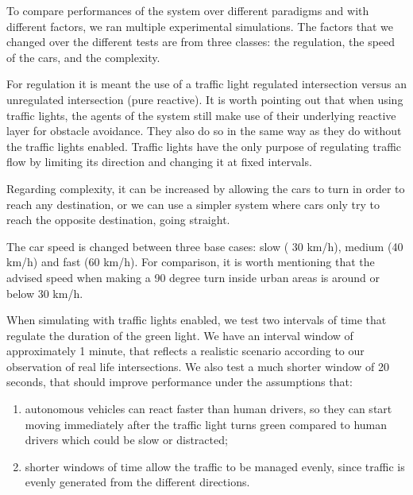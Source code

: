

To compare performances of the system over different paradigms and with different factors, we ran
multiple experimental simulations.
The factors that we changed over the different tests are from three classes: the regulation, the speed of the cars, and the complexity.

For regulation it is meant the use of  a traffic light regulated intersection versus an unregulated intersection (pure reactive).
It is worth pointing out that when using traffic lights, the agents of the system still make use of their underlying reactive layer for obstacle avoidance.
They also do so in the same way as they do without the traffic lights enabled.
Traffic lights have the only purpose of regulating traffic flow by limiting its direction and changing it at fixed intervals.

Regarding complexity, it can be increased by allowing the cars to turn in order to reach any destination, or we can use a simpler system where cars only try to reach the opposite destination, going straight.

The car speed is changed between three base cases: slow ( 30 km/h), medium (40 km/h) and fast (60 km/h).
For comparison, it is worth mentioning that the advised speed when making a 90 degree turn inside urban areas is around or below 30 km/h. %

When simulating with traffic lights enabled, we test two intervals of time that regulate the duration of the green light.
We have an interval window of approximately 1 minute, that reflects a realistic scenario according to our observation of real life intersections.
We also test a much shorter window of 20 seconds, that should improve performance under the assumptions that:
\begin{enumerate}
\item autonomous vehicles can react faster than human drivers, so they can start moving immediately after the traffic light turns green compared to human drivers which could be slow or distracted;
\item shorter windows of time allow the traffic to be managed evenly, since traffic is evenly generated from the different directions.
\end{enumerate}

